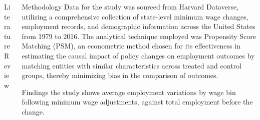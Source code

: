 \documentclass[final]{beamer}
\begin{document}
\begin{frame}[t]
\begin{columns}[T]
\begin{column}{.32\textwidth}
\begin{block}{\Huge Literature Review}
    \end{block}
\end{column}

\begin{column}{.32\textwidth}
    \begin{block}{\Huge Methodology} %
    \Large %
    Data for the study was sourced from Harvard Dataverse, utilizing a comprehensive collection of state-level minimum wage changes, employment records, and demographic information across the United States from 1979 to 2016. The analytical technique employed was Propensity Score Matching (PSM), an econometric method chosen for its effectiveness in estimating the causal impact of policy changes on employment outcomes by matching entities with similar characteristics across treated and control groups, thereby minimizing bias in the comparison of outcomes.
    
    \end{block}

    \vspace{1cm} %

    \begin{block}{\Huge Findings} %
    \Large %
    the study shows average employment variations by wage bin following minimum wage adjustments, against total employment before the change.
\end{block}
\end{column}


\end{columns}
\end{frame}
\end{document}
